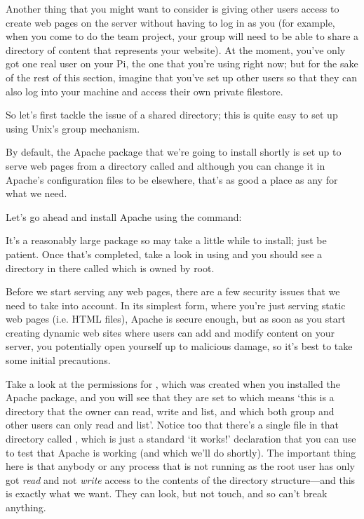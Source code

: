 Another thing that you might want to consider is giving other users access to create web pages on the server without having to log in as you (for example, when you come to do the team project, your group will need to be able to share a directory of content that represents your website). At the moment, you've only got one real user on your Pi, the one that you're using right now; but for the sake of the rest of this section, imagine that you've set up other users so that they can also log into your machine and access their own private filestore. 

So let's first tackle the issue of a shared directory; this is quite easy to set up using Unix's group mechanism. 

By default, the Apache package that we're going to install shortly is set up to serve web pages from a directory called  and although you can change it in Apache's configuration files to be elsewhere, that's as good a place as any for what we need. 

Let's go ahead and install Apache using the command:


It's a reasonably large package so may take a little while to install; just be patient. Once that's completed, take a look in  using  and you should see a directory in there called  which is owned by root.

Before we start serving any web pages, there are a few security issues that we need to take into account. In its simplest form, where you're just serving static web pages (i.e. HTML files), Apache is secure enough, but as soon as you start creating dynamic web sites where users can add and modify content on your server, you potentially open yourself up to malicious damage, so it's best to take some initial precautions. 

Take a look at the permissions for , which was created when you installed the Apache package, and you will see that they are set to  which means `this is a directory that the owner can read, write and list, and which both group and other users can only read and list'. Notice too that there's a single file in that directory called , which is just a standard `it works!' declaration that you can use to test that Apache is working (and which we'll do shortly). The important thing here is that anybody or any process that is not running as the root user has only got \textit{read} and not \textit{write} access to the contents of the  directory structure---and this is exactly what we want. They can look, but not touch, and so can't break anything. 

